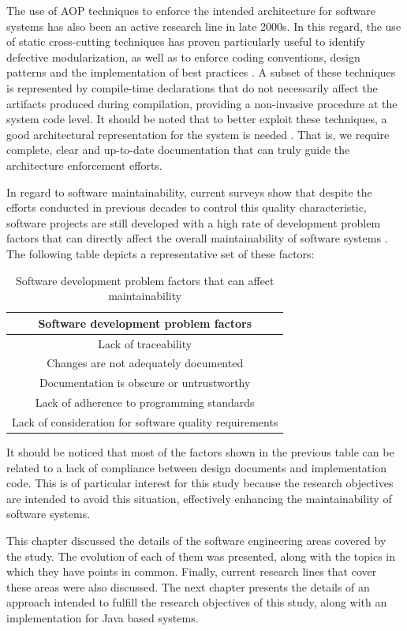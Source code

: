 \documentclass[10pt]{article}
\begin{document}
The use of AOP techniques to enforce the intended architecture for software systems has also been an active research line in late 2000s. In this regard, the use of static cross-cutting techniques has proven particularly useful to identify defective modularization, as well as to enforce coding conventions, design patterns and the implementation of best practices \cite{Merson07}. A subset of these techniques is represented by compile-time declarations that do not necessarily affect the artifacts produced during compilation, providing a non-invasive procedure at the system code level. It should be noted that to better exploit these techniques, a good architectural representation for the system is needed \cite{Merson07}. That is, we require complete, clear and up-to-date documentation that can truly guide the architecture enforcement efforts.

In regard to software maintainability, current surveys show that despite the efforts conducted in previous decades to control this quality characteristic, software projects are still developed with a high rate of development problem factors that can directly affect the overall maintainability of software systems \cite{Chen09}. The following table depicts a representative set of these factors:



\begin{table}[htbp]
	\centering
	\caption{Software development problem factors that can affect maintainability}
	\label{table:problem_factors}
		\begin{tabular}{|c|}
			\hline
			{\bf Software development problem factors} \\ \hline
			Lack of traceability \\ \hline
			Changes are not adequately documented \\  \hline
			Documentation is obscure or untrustworthy \\  \hline
			Lack of adherence to programming standards \\  \hline
			Lack of consideration for software quality requirements \\  \hline
		\end{tabular}
\end{table}



It should be noticed that most of the factors shown in the previous table can be related to a lack of compliance between design documents and implementation code. This is of particular interest for this study because the research objectives are intended to avoid this situation, effectively enhancing the maintainability of software systems.

This chapter discussed the details of the software engineering areas covered by the study. The evolution of each of them was presented, along with the topics in which they have points in common. Finally, current research lines that cover these areas were also discussed. The next chapter presents the details of an approach intended to fulfill the research objectives of this study, along with an implementation for Java based systems.




\end{document}
